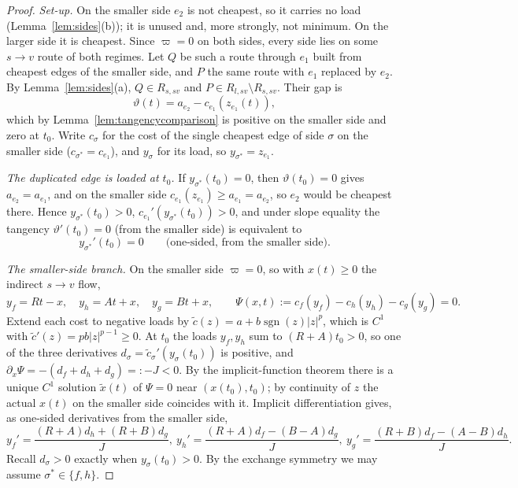 \begin{proof}
\emph{Set-up.} On the smaller side $e_2$ is not cheapest, so it carries no
load (Lemma~\ref{lem:sides}(b)); it is unused and, more strongly, not
minimum. On the larger side it is cheapest. Since $\varpi=0$ on both sides,
every side lies on some $s\to v$ route of both regimes. Let $Q$ be such a
route through $e_1$ built from cheapest edges of the smaller side, and $P$ the
same route with $e_1$ replaced by $e_2$. By Lemma~\ref{lem:sides}(a),
$Q\in R_{s,sv}$ and $P\in R_{l,sv}\setminus R_{s,sv}$. Their gap is
\[
 \vartheta(t)=a_{e_2}-c_{e_1}(z_{e_1}(t)),
\]
which by Lemma~\ref{lem:tangencycomparison} is positive on the smaller side and zero at
$t_0$. Write $c_\sigma$ for the cost of the single cheapest edge of side
$\sigma$ on the smaller side ($c_{\sigma^*}=c_{e_1}$), and $y_\sigma$ for its
load, so $y_{\sigma^*}=z_{e_1}$.

\emph{The duplicated edge is loaded at $t_0$.} If $y_{\sigma^*}(t_0)=0$, then
$\vartheta(t_0)=0$ gives $a_{e_2}=a_{e_1}$, and on the smaller side
$c_{e_1}(z_{e_1})\ge a_{e_1}=a_{e_2}$, so $e_2$ would be cheapest there. Hence
$y_{\sigma^*}(t_0)>0$, $c_{e_1}'(y_{\sigma^*}(t_0))>0$, and under slope
equality the tangency $\vartheta'(t_0)=0$ (from the smaller side) is equivalent
to
\begin{equation}\label{eq:min_stationary}
 y_{\sigma^*}'(t_0)=0\qquad\text{(one-sided, from the smaller side)}.
\end{equation}

\emph{The smaller-side branch.} On the smaller side $\varpi=0$, so with
$x(t)\ge0$ the indirect $s\to v$ flow,
\[
 y_f=Rt-x,\quad y_h=At+x,\quad y_g=Bt+x,\qquad
 \Psi(x,t):=c_f(y_f)-c_h(y_h)-c_g(y_g)=0 .
\]
Extend each cost to negative loads by $\tilde c(z)=a+b\operatorname{sgn}(z)
|z|^p$, which is $C^1$ with $\tilde c'(z)=pb|z|^{p-1}\ge0$. At $t_0$ the loads
$y_f,y_h$ sum to $(R+A)t_0>0$, so one of the three derivatives
$d_\sigma=\tilde c_\sigma'(y_\sigma(t_0))$ is positive, and
$\partial_x\Psi=-(d_f+d_h+d_g)=:-J<0$. By the implicit-function theorem there
is a unique $C^1$ solution $\tilde x(t)$ of $\Psi=0$ near $(x(t_0),t_0)$;
by continuity of $z$ the actual $x(t)$ on the smaller side coincides with
it. Implicit differentiation gives, as one-sided derivatives from the
smaller side,
\begin{equation}\label{eq:min_velocities}
 y_f'=\frac{(R+A)d_h+(R+B)d_g}J,\
 y_h'=\frac{(R+A)d_f-(B-A)d_g}J,\
 y_g'=\frac{(R+B)d_f-(A-B)d_h}J .
\end{equation}
Recall $d_\sigma>0$ exactly when $y_\sigma(t_0)>0$. By the exchange symmetry
we may assume $\sigma^*\in\{f,h\}$.


\end{proof}
